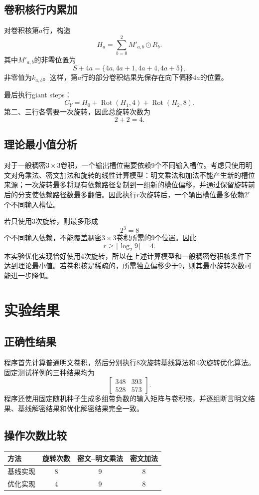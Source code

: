\documentclass[UTF8,a4paper,12pt]{ctexart}
\begin{document}
\subsection{卷积核行内累加}
对卷积核第$a$行，构造
\[
H_a=\sum_{b=0}^{2}M'_{a,b}\odot R_b.
\]
其中$M'_{a,b}$的非零位置为
\[
S+4a=\{4a,4a+1,4a+4,4a+5\},
\]
非零值为$k_{a,b}$。这样，第$a$行的部分卷积结果先保存在向下偏移$4a$的位置。

最后执行giant steps：
\[
C_Y=H_0+\operatorname{Rot}(H_1,4)+\operatorname{Rot}(H_2,8).
\]
第二、三行各需要一次旋转，因此总旋转次数为
\[
2+2=4.
\]

\subsection{理论最小值分析}
对于一般稠密$3\times3$卷积，一个输出槽位需要依赖9个不同输入槽位。考虑只使用明文对角乘法、密文加法和旋转的线性计算模型：明文乘法和加法不能产生新的槽位来源；一次旋转最多将现有依赖路径复制到一组新的槽位偏移，并通过保留旋转前后的分支使依赖路径数最多翻倍。因此执行$r$次旋转后，一个输出槽位最多依赖$2^r$个不同输入槽位。

若只使用3次旋转，则最多形成
\[
2^3=8
\]
个不同输入依赖，不能覆盖稠密$3\times3$卷积所需的9个位置。因此
\[
r\geq\lceil\log_2 9\rceil=4.
\]
本实验优化实现恰好使用4次旋转，所以在上述计算模型和一般稠密卷积核条件下达到理论最小值。若卷积核是稀疏的，所需独立偏移少于9，则其最小旋转次数可能进一步降低。

\section{实验结果}
\subsection{正确性结果}
程序首先计算普通明文卷积，然后分别执行8次旋转基线算法和4次旋转优化算法。固定测试样例的三种结果均为
\[
\begin{bmatrix}
348&393\\
528&573
\end{bmatrix}.
\]
程序还使用固定随机种子生成多组带负数的输入矩阵与卷积核，并逐组断言明文结果、基线解密结果和优化解密结果完全一致。

\subsection{操作次数比较}
\begin{table}[H]
\centering
\begin{tabular}{lccc}
\toprule
方法 & 旋转次数 & 密文--明文乘法 & 密文加法\\
\midrule
基线实现 & 8 & 9 & 8\\
优化实现 & 4 & 9 & 8\\
\bottomrule
\end{tabular}
\end{table}
\end{document}
